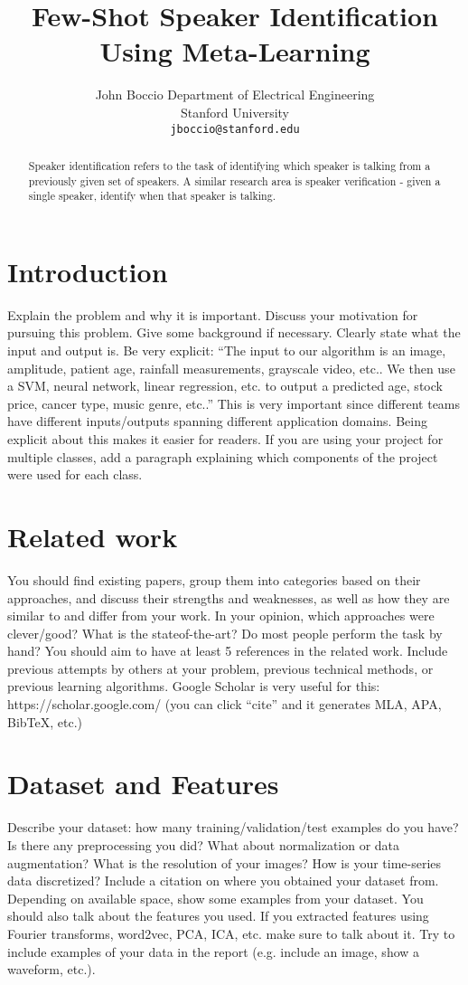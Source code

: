 \documentclass{article}
\title{Few-Shot Speaker Identification Using Meta-Learning}
\author{
  John Boccio
  Department of Electrical Engineering\\
  Stanford University\\
  \texttt{jboccio@stanford.edu} \\
}
\begin{document}
\maketitle

\begin{abstract}
Speaker identification refers to the task of identifying which speaker is talking from a previously given set of 
speakers. A similar research area is speaker verification - given a single speaker, identify when that speaker is 
talking. 

\end{abstract}

\section{Introduction}	
Explain the problem and why it is important. Discuss your motivation for pursuing this
problem. Give some background if necessary. Clearly state what the input and output
is. Be very explicit: “The input to our algorithm is an {image, amplitude, patient age,
rainfall measurements, grayscale video, etc.}. We then use a {SVM, neural network, linear
regression, etc.} to output a predicted {age, stock price, cancer type, music genre, etc.}.”
This is very important since different teams have different inputs/outputs spanning different
application domains. Being explicit about this makes it easier for readers. If you are using
your project for multiple classes, add a paragraph explaining which components of the
project were used for each class.

\section{Related work}
You should find existing papers, group them into categories based on their approaches,
and discuss their strengths and weaknesses, as well as how they are similar to and differ
from your work. In your opinion, which approaches were clever/good? What is the stateof-the-art?
Do most people perform the task by hand? You should aim to have at least
5 references in the related work. Include previous attempts by others at your problem,
previous technical methods, or previous learning algorithms. Google Scholar is very useful
for this: https://scholar.google.com/ (you can click “cite” and it generates MLA, APA,
BibTeX, etc.)

\section{Dataset and Features}
Describe your dataset: how many training/validation/test examples do you have? Is there
any preprocessing you did? What about normalization or data augmentation? What is the
resolution of your images? How is your time-series data discretized? Include a citation on
where you obtained your dataset from. Depending on available space, show some examples
from your dataset. You should also talk about the features you used. If you extracted
features using Fourier transforms, word2vec, PCA,
ICA, etc. make sure to talk about it. Try to include examples of your data in the report
(e.g. include an image, show a waveform, etc.).
\end{document}
